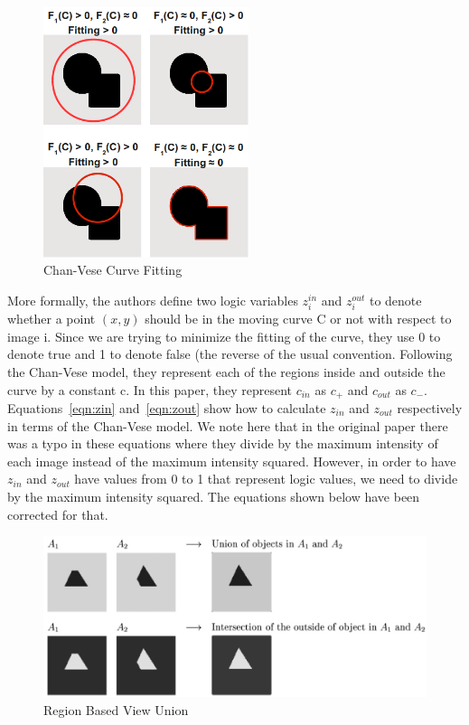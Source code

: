 \documentclass[10pt,journal,letterpaper,compsoc]{IEEEtran}
\begin{document}
\begin{figure}[t!]
\centering
\includegraphics[width=6cm]{fitting.png}
\caption{Chan-Vese Curve Fitting}
\label{fig:fitting}
\end{figure}

More formally, the authors define two logic variables $z_{i}^{in}$ and $z_{i}^{out}$ to denote whether a point $(x,y)$ should be in the moving curve C or not
with respect to image i. Since we are trying to minimize the fitting of the curve, they use 0 to denote true and 1 to denote false (the reverse of the usual
convention. Following the Chan-Vese model, they represent each of the regions inside and outside the curve by a constant c. In this paper, they represent
$c_{in}$ as $c_{+}$ and $c_{out}$ as $c_{-}$. Equations~\ref{eqn:zin} and~\ref{eqn:zout} show how to calculate $z_{in}$ and $z_{out}$ respectively in terms of
the Chan-Vese model. We note here that in the original paper there was a typo in these equations where they divide by the maximum intensity of each image
instead of the maximum intensity squared. However, in order to have $z_{in}$ and $z_{out}$ have values from 0 to 1 that represent logic values, we need to
divide by the maximum intensity squared. The equations shown below have been corrected for that.

\begin{figure}[t]
\centering
\includegraphics[width=12cm]{logicop.png}
\caption{Region Based View Union}
\label{fig:logic-op}
\end{figure}
\end{document}
